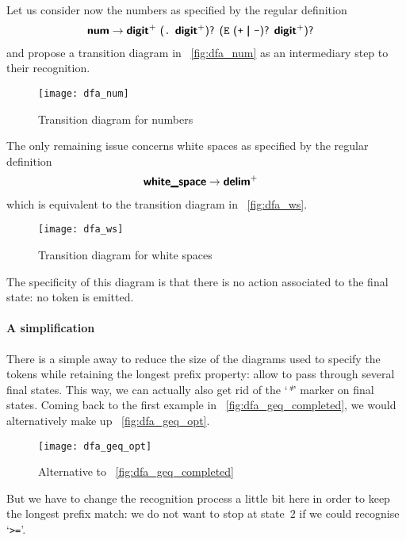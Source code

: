  
Let us consider now the numbers as specified by the regular definition
\begin{align*}
\term{num} & \rightarrow \text{\term{digit}\plus{} \lparen\exc{.}
  \term{digit}\plus\rparen\opt{} \lparen\exc{E} \lparen\exc{+} \disj
  \exc{-}\rparen\opt{} \term{digit}\plus\rparen\opt}
\end{align*}
and propose a transition diagram in \fig~\vref{fig:dfa_num} as an
intermediary step to their recognition.
\begin{figure}
\centering
\texttt{[image: dfa\_num]}
\caption{Transition diagram for numbers\label{fig:dfa_num}}
\end{figure}

 
The only remaining issue concerns white spaces as specified by the
regular definition
\begin{align*}
\term{white\_space} & \rightarrow \text{\term{delim}\plus}
\end{align*}
which is equivalent to the transition diagram in \fig~\vref{fig:dfa_ws}.
\begin{figure}
\centering
\texttt{[image: dfa\_ws]}
\caption{Transition diagram for white spaces\label{fig:dfa_ws}}
\end{figure}
The specificity of this diagram is that there is no action
associated to the final state: no token is emitted.

\paragraph{A simplification}
 
There is a simple away to reduce the size of the diagrams used to
specify the tokens while retaining the longest prefix property: allow
to pass through several final states. This way, we can actually also
get rid of the `\emph{\textsc{*}}' marker on final states. Coming back
to the first example in \fig~\vref{fig:dfa_geq_completed}, we would
alternatively make up \fig~\vref{fig:dfa_geq_opt}.
\begin{figure}
\centering
\texttt{[image: dfa\_geq\_opt]}
\caption{Alternative to \fig~\vref{fig:dfa_geq_completed}
\label{fig:dfa_geq_opt}}
\end{figure}
But we have to change the recognition process a little bit here in
order to keep the longest prefix match: we do not want to stop at
state~\(2\) if we could recognise `\texttt{>=}'.

